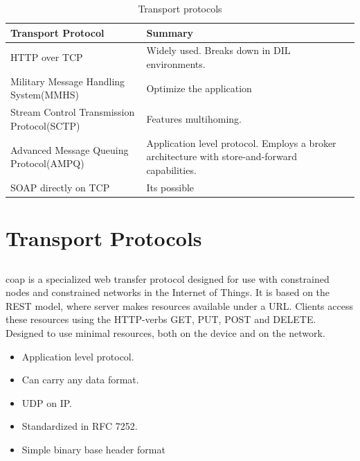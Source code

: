 \documentclass[USenglish]{ifimaster}
\begin{document}
\begin{table}[h]
\begin{tabularx}{\textwidth}{| X | X |}
\hline
  \textbf{Transport Protocol} & \textbf{Summary} \\ \hline
  HTTP over TCP & Widely used. Breaks down in DIL environments.\\ \hline
  Military Message Handling System(MMHS) & Optimize the application\\ \hline
  Stream Control Transmission Protocol(SCTP) & Features multihoming. \\ \hline
  Advanced Message Queuing Protocol(AMPQ) & Application level protocol. Employs
  a broker architecture with store-and-forward capabilities. \\ \hline
  SOAP directly on TCP & Its possible \\ \hline
\end{tabularx}
\caption{Transport protocols}
\end{table}


\section{Transport Protocols}

\subsection{}

\gls{coap} is a specialized web transfer protocol designed for use with
constrained nodes and constrained networks in the Internet of Things. It is
based on the REST model, where server makes resources available  under a URL.
Clients access these resources using the HTTP-verbs GET, PUT, POST and DELETE.
Designed to use minimal resources, both on the device and on the network.

\begin{itemize}
    \item Application level protocol.
    \item Can carry any data format.
    \item UDP on IP.
    \item Standardized in RFC 7252.
    \item Simple binary base header format
\end{itemize}
\end{document}
